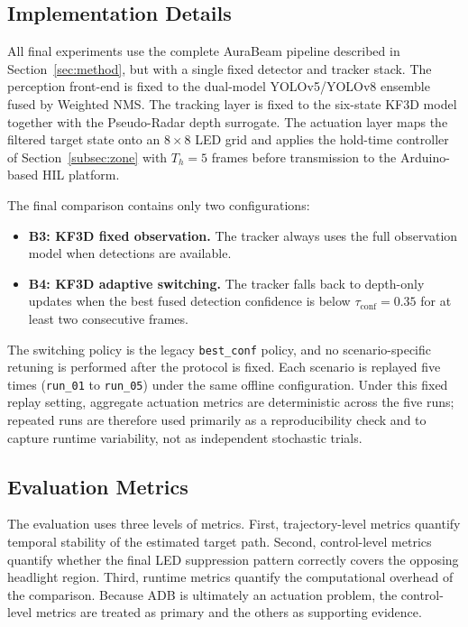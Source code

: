\documentclass[pdflatex,sn-mathphys-num]{sn-jnl}%
\theoremstyle{thmstyleone}%
\theoremstyle{thmstyletwo}%
\theoremstyle{thmstylethree}%
\begin{document}
\subsection{Implementation Details}
\label{subsec:eval_impl}

All final experiments use the complete AuraBeam pipeline described in
Section~\ref{sec:method}, but with a single fixed detector and tracker
stack. The perception front-end is fixed to the dual-model YOLOv5/YOLOv8
ensemble fused by Weighted NMS. The tracking layer is fixed to the
six-state KF3D model together with the Pseudo-Radar depth surrogate. The
actuation layer maps the filtered target state onto an $8\times8$ LED
grid and applies the hold-time controller of
Section~\ref{subsec:zone} with $T_h = 5$ frames before transmission to
the Arduino-based HIL platform.

The final comparison contains only two configurations:
\begin{itemize}
    \item \textbf{B3: KF3D fixed observation.} The tracker always uses the full observation model when detections are available.
    \item \textbf{B4: KF3D adaptive switching.} The tracker falls back to depth-only updates when the best fused detection confidence is below $\tau_{\mathrm{conf}} = 0.35$ for at least two consecutive frames.
\end{itemize}

The switching policy is the legacy \texttt{best\_conf} policy, and no
scenario-specific retuning is performed after the protocol is fixed.
Each scenario is replayed five times (\texttt{run\_01} to
\texttt{run\_05}) under the same offline configuration. Under this fixed
replay setting, aggregate actuation metrics are deterministic across the
five runs; repeated runs are therefore used primarily as a
reproducibility check and to capture runtime variability, not as
independent stochastic trials.

\subsection{Evaluation Metrics}
\label{subsec:eval_metrics}

The evaluation uses three levels of metrics. First, trajectory-level
metrics quantify temporal stability of the estimated target path.
Second, control-level metrics quantify whether the final LED
suppression pattern correctly covers the opposing headlight region.
Third, runtime metrics quantify the computational overhead of the
comparison. Because ADB is ultimately an actuation problem, the
control-level metrics are treated as primary and the others as
supporting evidence.
\end{document}
